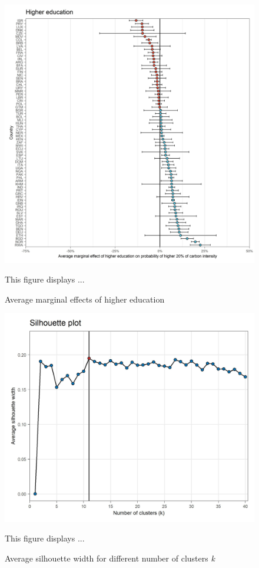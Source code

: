 \documentclass[12pt, a4paper]{article}
\newenvironment{subcaption}
{\strut
\vspace{-5pt}
\begin{minipage}[b]{0.9\textwidth}
  \hspace*{-\parindent}
  \footnotesize}
 {\end{minipage}}
\begin{document}
 \begin{figure}[ht!]
   \centering
   \caption{Average marginal effects of higher education} \label{fig:F11_high_edu}
   \includegraphics{Analysis_Logit_Models_Marginal_Effects/Average_Marginal_Effects_affected_upper_80_higher_education}
   \begin{subcaption}
     This figure displays ...
   \end{subcaption}
 \end{figure}

 \clearpage

 \begin{figure}[ht!]
   \centering
   \caption{Average silhouette width for different number of clusters \textit{k}} \label{fig:G1_silhouette}
   \includegraphics{Figures_Appendix/Figure_Silhouette}
   \begin{subcaption}
     This figure displays ...
   \end{subcaption}
 \end{figure}
\end{document}
